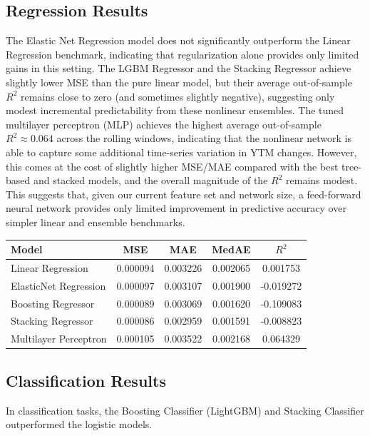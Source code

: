 \documentclass[12pt]{article}
\begin{document}
\subsection{Regression Results}
The Elastic Net Regression model does not significantly outperform the Linear Regression benchmark, indicating that regularization alone provides only limited gains in this setting. The LGBM Regressor and the Stacking Regressor achieve slightly lower MSE than the pure linear model, but their average out-of-sample $R^2$ remains close to zero (and sometimes slightly negative), suggesting only modest incremental predictability from these nonlinear ensembles.
The tuned multilayer perceptron (MLP) achieves the highest average out-of-sample $R^2 \approx 0.064$ across the rolling windows, indicating that the nonlinear network is able to capture some additional time-series variation in YTM changes. However, this comes at the cost of slightly higher MSE/MAE compared with the best tree-based and stacked models, and the overall magnitude of the $R^2$ remains modest. This suggests that, given our current feature set and network size, a feed-forward neural network provides only limited improvement in predictive accuracy over simpler linear and ensemble benchmarks.

\begin{table}[h!]
\centering
\begin{tabular}{lcccc}
\hline
Model & MSE & MAE & MedAE & $R^2$ \\
\hline
Linear Regression  & 0.000094 & 0.003226 & 0.002065 &  0.001753 \\
ElasticNet Regression       & 0.000097 & 0.003107 & 0.001900 & -0.019272 \\
Boosting Regressor     & 0.000089 & 0.003069 & 0.001620 & -0.109083 \\
Stacking Regressor & 0.000086 & 0.002959 & 0.001591 & -0.008823 \\
Multilayer Perceptron & 0.000105 & 0.003522 & 0.002168 & 0.064329 \\
\hline
\end{tabular}
\end{table}

\subsection{Classification Results}
In classification tasks, the Boosting Classifier (LightGBM) and Stacking Classifier outperformed the logistic models.
\end{document}
